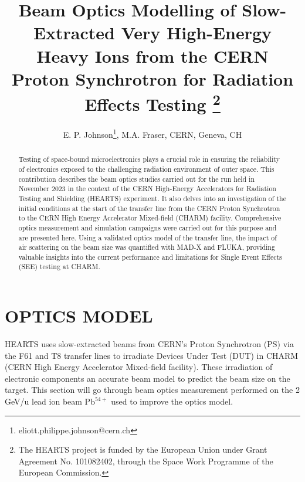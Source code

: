 \documentclass[a4paper,
               biblatex,     %
               ]{jacow}
\begin{document}
\title{Beam Optics Modelling of Slow-Extracted Very High-Energy Heavy Ions from the CERN Proton Synchrotron for Radiation Effects Testing \thanks{The HEARTS project is funded by the European Union under Grant Agreement No. 101082402, through the Space Work Programme of the European Commission.}}

\author{E. P. Johnson\thanks{eliott.philippe.johnson@cern.ch}, M.A. Fraser, CERN, Geneva, CH}
	
\maketitle

%
\begin{abstract}
   Testing of space-bound microelectronics plays a crucial role in ensuring the reliability of electronics exposed to the challenging radiation environment of outer space. This contribution describes the beam optics studies carried out for the run held in November 2023 in the context of the CERN High-Energy Accelerators for Radiation Testing and Shielding (HEARTS) experiment. It also delves into an investigation of the initial conditions at the start of the transfer line from the CERN Proton Synchrotron to the CERN High Energy Accelerator Mixed-field (CHARM) facility. Comprehensive optics measurement and simulation campaigns were carried out for this purpose and are presented here. Using a validated optics model of the transfer line, the impact of air scattering on the beam size was quantified with MAD-X and FLUKA, providing valuable insights into the current performance and limitations for Single Event Effects (SEE) testing at CHARM.
\end{abstract}







\section{OPTICS MODEL}

HEARTS uses slow-extracted beams from CERN's Proton Synchrotron (PS) via the F61 and T8 transfer lines to irradiate Devices Under Test (DUT) in CHARM (CERN High Energy Accelerator Mixed-field facility). These irradiation of electronic components an accurate beam model to predict the beam size on the target. This section will go through beam optics measurement performed on the 2 GeV/u lead ion beam \( \text{Pb}^{54+} \) used to improve the optics model.
\end{document}
